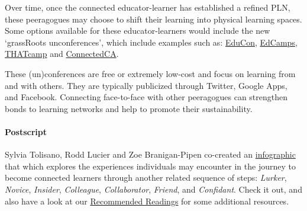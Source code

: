 Over time, once the connected educator-learner has established a refined
PLN, these peeragogues may choose to shift their learning into physical
learning spaces. Some options available for these educator-learners
would include the new `grassRoots unconferences', which include examples
such as: \href{http://educonphilly.org/}{EduCon},
\href{http://davidwees.com/content/what-edcamp}{EdCamps},
\href{http://thatcamp.org/}{THATcamp} and
\href{http://connectedcanada.org/}{ConnectedCA}. 

These (un)conferences are free or extremely low-cost and focus on learning
from and with others.  They are typically publicized
through Twitter, Google Apps, and Facebook. Connecting face-to-face
with other peeragogues can strengthen bonds to learning networks and
help to promote their sustainability.

\paragraph{Postscript}

Sylvia Tolisano, Rodd Lucier and Zoe Branigan-Pipen co-created an
\href{http://farm9.staticflickr.com/8160/7161689001\_9b6725a4ca\_h.jpg}{infographic}
that which explores the experiences individuals may encounter in the
journey to become connected learners through another related sequence of
steps: \emph{Lurker}, \emph{Novice}, \emph{Insider}, \emph{Colleague},
\emph{Collaborator}, \emph{Friend}, and \emph{Confidant}. Check it out,
and also have a look at our
\href{http://peeragogy.org/recommended-reading/}{Recommended Readings}
for some additional resources.
